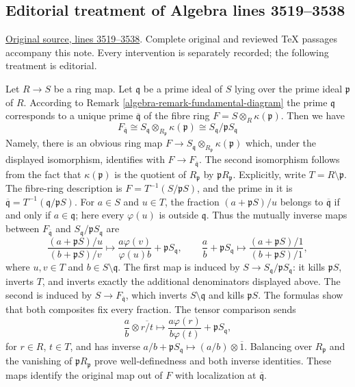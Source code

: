 \subsection{Editorial treatment of Algebra lines 3519--3538}

\hypertarget{algebra-context-016}{}

\noindent\href{https://github.com/stacks/stacks-project/blob/a04446e57ec1fbc252a871afcec7752fb2807b14/algebra.tex\#L3519}{Original source, lines 3519--3538}. Complete original and reviewed TeX passages accompany this note. Every intervention is separately recorded; the following treatment is editorial.


\begin{remark}
\label{editorial-source-remark-local-ring-fibre}
Let $R \to S$ be a ring map. Let $\mathfrak q$ be a prime
ideal of $S$ lying over the prime ideal $\mathfrak p$ of $R$.
According to Remark \ref{algebra-remark-fundamental-diagram}
the prime $\mathfrak q$ corresponds to a unique prime
$\overline{\mathfrak q}$ of the fibre ring
$F = S \otimes_R \kappa(\mathfrak p)$.
Then we have
$$
F_{\overline{\mathfrak q}}
\cong S_\mathfrak q \otimes_{R_\mathfrak p} \kappa(\mathfrak p)
\cong S_\mathfrak q/\mathfrak p S_\mathfrak q
$$
Namely, there is an obvious ring map
$F \to S_\mathfrak q \otimes_{R_\mathfrak p} \kappa(\mathfrak p)$
which, under the displayed isomorphism, identifies with $F \to F_{\overline{\mathfrak q}}$.
The second isomorphism follows from the fact that $\kappa(\mathfrak p)$
is the quotient of $R_\mathfrak p$ by $\mathfrak pR_\mathfrak p$.
Explicitly, write $T=R\setminus\mathfrak p$. The fibre-ring
description is $F=T^{-1}(S/\mathfrak pS)$, and the prime in it is
$\overline{\mathfrak q}=T^{-1}(\mathfrak q/\mathfrak pS)$.
For $a\in S$ and $u\in T$, the fraction
$(a+\mathfrak pS)/u$ belongs to $\overline{\mathfrak q}$
if and only if $a\in\mathfrak q$; here every $\varphi(u)$
is outside $\mathfrak q$.
Thus the mutually inverse maps between $F_{\overline{\mathfrak q}}$
and $S_{\mathfrak q}/\mathfrak pS_{\mathfrak q}$ are
$$
\frac{(a+\mathfrak pS)/u}{(b+\mathfrak pS)/v}
\longmapsto
\frac{a\varphi(v)}{\varphi(u)b}+\mathfrak pS_{\mathfrak q},
\qquad
\frac{a}{b}+\mathfrak pS_{\mathfrak q}
\longmapsto
\frac{(a+\mathfrak pS)/1}{(b+\mathfrak pS)/1},
$$
where $u,v\in T$ and $b\in S\setminus\mathfrak q$.
The first map is induced by $S\to S_{\mathfrak q}/\mathfrak pS_{\mathfrak q}$:
it kills $\mathfrak pS$, inverts $T$, and inverts exactly the
additional denominators displayed above. The second is induced by
$S\to F_{\overline{\mathfrak q}}$, which inverts
$S\setminus\mathfrak q$ and kills $\mathfrak pS$.
The formulas show that both composites fix every fraction.
The tensor comparison sends
$$
\frac{a}{b}\otimes\overline{r/t}
\longmapsto
\frac{a\varphi(r)}{b\varphi(t)}+\mathfrak pS_{\mathfrak q},
$$
for $r\in R$, $t\in T$, and has inverse
$a/b+\mathfrak pS_{\mathfrak q}\mapsto(a/b)\otimes\overline{1}$.
Balancing over $R_{\mathfrak p}$ and the vanishing of
$\mathfrak pR_{\mathfrak p}$ prove well-definedness and both
inverse identities. These maps identify the original map out of
$F$ with localization at $\overline{\mathfrak q}$.
\end{remark}


